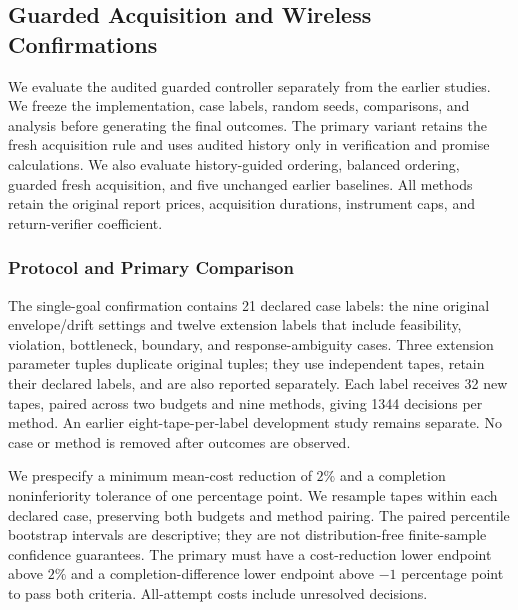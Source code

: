 \subsection{Guarded Acquisition and Wireless Confirmations}
\label{app:v37-study}
We evaluate the audited guarded controller separately from the earlier studies. We freeze the implementation, case labels, random seeds, comparisons, and analysis before generating the final outcomes. The primary variant retains the fresh acquisition rule and uses audited history only in verification and promise calculations. We also evaluate history-guided ordering, balanced ordering, guarded fresh acquisition, and five unchanged earlier baselines. All methods retain the original report prices, acquisition durations, instrument caps, and return-verifier coefficient.

\subsubsection{Protocol and Primary Comparison}
The single-goal confirmation contains 21 declared case labels: the nine original envelope/drift settings and twelve extension labels that include feasibility, violation, bottleneck, boundary, and response-ambiguity cases. Three extension parameter tuples duplicate original tuples; they use independent tapes, retain their declared labels, and are also reported separately. Each label receives 32 new tapes, paired across two budgets and nine methods, giving 1344 decisions per method. An earlier eight-tape-per-label development study remains separate. No case or method is removed after outcomes are observed.

We prespecify a minimum mean-cost reduction of $2\%$ and a completion noninferiority tolerance of one percentage point. We resample tapes within each declared case, preserving both budgets and method pairing. The paired percentile bootstrap intervals are descriptive; they are not distribution-free finite-sample confidence guarantees. The primary must have a cost-reduction lower endpoint above $2\%$ and a completion-difference lower endpoint above $-1$ percentage point to pass both criteria. All-attempt costs include unresolved decisions.

